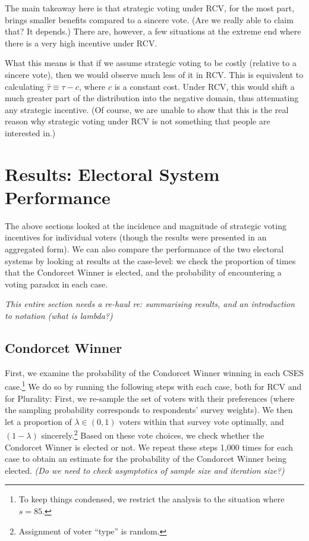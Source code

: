 \documentclass[11pt, letter]{article}
\begin{document}
The main takeaway here is that strategic voting under RCV, for the most part, brings smaller benefits compared to a sincere vote. (Are we really able to claim that? It depends.) There are, however, a few situations at the extreme end where there is a very high incentive under RCV.

What this means is that if we assume strategic voting to be costly (relative to a sincere vote), then we would observe much less of it in RCV. This is equivalent to calculating $\hat{\tau} \equiv \tau - c$, where $c$ is a constant cost. Under RCV, this would shift a much greater part of the distribution into the negative domain, thus attenuating any strategic incentive. (Of course, we are unable to show that this is the real reason why strategic voting under RCV is not something that people are interested in.)

\section{Results: Electoral System Performance}

The above sections looked at the incidence and magnitude of strategic voting incentives for individual voters (though the results were presented in an aggregated form). We can also compare the performance of the two electoral systems by looking at results at the case-level: we check the proportion of times that the Condorcet Winner is elected, and the probability of encountering a voting paradox in each case.

\textit{This entire section needs a re-haul re: summarising results, and an introduction to notation (what is lambda?)}

\subsection{Condorcet Winner}

First, we examine the probability of the Condorcet Winner winning in each CSES case.\footnote{To keep things condensed, we restrict the analysis to the situation where $s = 85$.} We do so by running the following steps with each case, both for RCV and for Plurality: First, we re-sample the set of voters with their preferences (where the sampling probability corresponds to respondents' survey weights). We then let a proportion of $\lambda \in (0, 1)$ voters within that survey vote optimally, and $(1 - \lambda)$ sincerely.\footnote{Assignment of voter ``type'' is random.} Based on these vote choices, we check whether the Condorcet Winner is elected or not. We repeat these steps 1,000 times for each case to obtain an estimate for the probability of the Condorcet Winner being elected. \emph{(Do we need to check asymptotics of sample size and iteration size?)}
\end{document}
